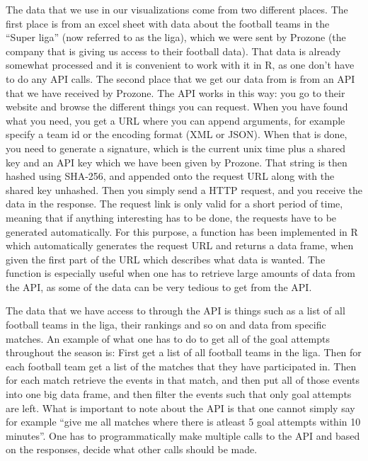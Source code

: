 \documentclass[Report.tex]{subfiles}
\begin{document}
The data that we use in our visualizations come from two different places. The first place is from an excel sheet with data about the football teams in the ``Super liga'' (now referred to as the liga), which we were sent by Prozone (the company that is giving us access to their football data). That data is already somewhat processed and it is convenient to work with it in R, as one don't have to do any API calls. The second place that we get our data from is from an API that we have received by Prozone. The API works in this way: you go to their website and browse the different things you can request. When you have found what you need, you get a URL where you can append arguments, for example specify a team id or the encoding format (XML or JSON). When that is done, you need to generate a signature, which is the current unix time plus a shared key and an API key which we have been given by Prozone. That string is then hashed using SHA-256, and appended onto the request URL along with the shared key unhashed. Then you simply send a HTTP request, and you receive the data in the response. The request link is only valid for a short period of time, meaning that if anything interesting has to be done, the requests have to be generated automatically. For this purpose, a function has been implemented in R which automatically generates the request URL and returns a data frame, when given the first part of the URL which describes what data is wanted. The function is especially useful when one has to retrieve large amounts of data from the API, as some of the data can be very tedious to get from the API. 

The data that we have access to through the API is things such as a list of all football teams in the liga, their rankings and so on and data from specific matches. An example of what one has to do to get all of the goal attempts throughout the season is: First get a list of all football teams in the liga. Then for each football team get a list of the matches that they have participated in. Then for each match retrieve the events in that match, and then put all of those events into one big data frame, and then filter the events such that only goal attempts are left. What is important to note about the API is that one cannot simply say for example ``give me all matches where there is atleast 5 goal attempts within 10 minutes''. One has to programmatically make multiple calls to the API and based on the responses, decide what other calls should be made.
\end{document}

